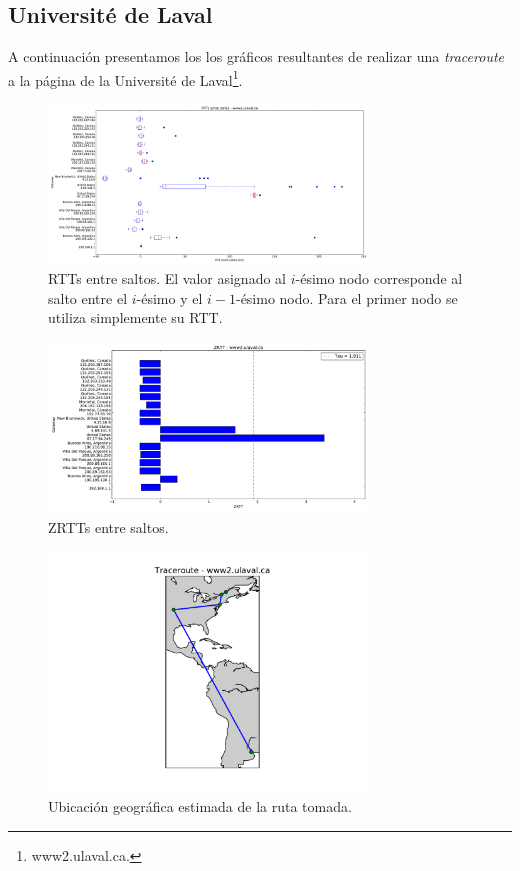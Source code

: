 \subsection{Université de Laval}

A continuación presentamos los los gráficos resultantes de realizar una \textit{traceroute} a la página de la Université de Laval\footnote{www2.ulaval.ca.}.

\begin{figure}[H]
    \centering
    \includegraphics[width=8.5cm]{img/grafico1-www2-ulaval-ca.pdf}
    \caption{\normalfont RTTs entre saltos. El valor asignado al $i$-ésimo nodo corresponde al salto entre el $i$-ésimo y el $i - 1$-ésimo nodo. Para el primer nodo se utiliza simplemente su RTT.}
\end{figure}

\begin{figure}[H]
    \centering
    \includegraphics[width=8.5cm]{img/grafico2-www2-ulaval-ca.pdf}
    \caption{\normalfont ZRTTs entre saltos.}
\end{figure}

\begin{figure}[H]
    \centering
    \includegraphics[width=8.5cm]{img/grafico3-www2-ulaval-ca.pdf}
    \caption{\normalfont Ubicación geográfica estimada de la ruta tomada.}
\end{figure}

